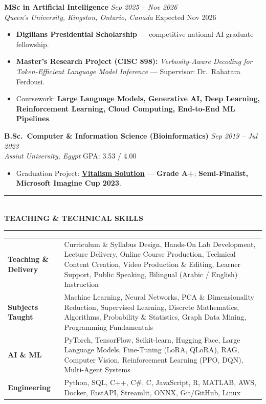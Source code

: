 \documentclass[10pt, a4paper]{article}
\newcommand{\cvsection}[1]{%
  \vspace{3pt}%
  {\color{navy}\rule{\linewidth}{1.1pt}}\\[0.5pt]%
  {\color{navy}\bfseries\fontsize{9.5}{11}\selectfont\uppercase{#1}}\\[-4pt]%
  {\color{teal}\rule{\linewidth}{0.6pt}}%
  \vspace{2pt}%
}
\newcommand{\cventry}[4]{%
  \vspace{2.5pt}%
  \textbf{\color{darkgray}#1} \hfill {\color{midgray}\textit{#3}}\\[-1.5pt]%
  {\color{teal}\textit{#2}} \hfill {\color{midgray}#4}%
}
\newenvironment{cvitems}{%
  \begin{itemize}[leftmargin=11pt, itemsep=0.5pt, parsep=0pt, topsep=1pt,
                  label={\textcolor{teal}{$\bullet$}}]
}{%
  \end{itemize}%
}
\begin{document}
\cventry{MSc in Artificial Intelligence}{Queen's University, Kingston, Ontario, Canada}
        {Sep 2025 -- Nov 2026}{Expected Nov 2026}
\begin{cvitems}
  \item \textbf{Digilians Presidential Scholarship} --- competitive national AI graduate fellowship.
  \item \textbf{Master's Research Project (CISC 898):} \textit{Verbosity-Aware Decoding for Token-Efficient Language Model Inference} --- Supervisor: Dr.\ Rahatara Ferdousi.
  \item Coursework: \textbf{Large Language Models, Generative AI, Deep Learning, Reinforcement Learning, Cloud Computing, End-to-End ML Pipelines}.
\end{cvitems}

\cventry{B.Sc.\ Computer \& Information Science (Bioinformatics)}{Assiut University, Egypt}
        {Sep 2019 -- Jul 2023}{GPA: 3.53 / 4.00}
\begin{cvitems}
  \item Graduation Project: \href{https://vitalismsolution.github.io/}{\textbf{Vitalism Solution}} --- \textbf{Grade A+}; \textbf{Semi-Finalist, Microsoft Imagine Cup 2023}.
\end{cvitems}

\cvsection{Teaching \& Technical Skills}

\renewcommand{\arraystretch}{1.1}
\begin{tabularx}{\linewidth}{@{}>{\raggedright\hyphenpenalty=10000\arraybackslash}p{35mm} X@{}}
\textbf{Teaching \& Delivery} &
Curriculum \& Syllabus Design, Hands-On Lab Development, Lecture Delivery, Online Course Production, Technical Content Creation, Video Production \& Editing, Learner Support, Public Speaking, Bilingual (Arabic / English) Instruction \\

\textbf{Subjects Taught} &
Machine Learning, Neural Networks, PCA \& Dimensionality Reduction, Supervised Learning, Discrete Mathematics, Algorithms, Probability \& Statistics, Graph Data Mining, Programming Fundamentals \\

\textbf{AI \& ML} &
PyTorch, TensorFlow, Scikit-learn, Hugging Face, Large Language Models, Fine-Tuning (LoRA, QLoRA), RAG, Computer Vision, Reinforcement Learning (PPO, DQN), Multi-Agent Systems \\

\textbf{Engineering} &
Python, SQL, C++, C\#, C, JavaScript, R, MATLAB, AWS, Docker, FastAPI, Streamlit, ONNX, Git/GitHub, Linux \\
\end{tabularx}
\end{document}
